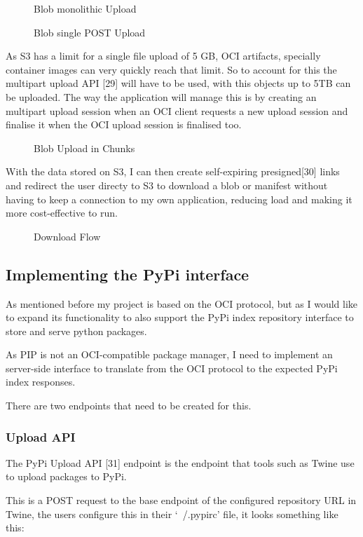 \documentclass{article}
\newcommand{\widefig}[3][1.2\textwidth]{%
  \begin{figure}[H]
    \makebox[\textwidth][c]{%
      \texttt{[image: \#2]}%
    }
    \caption{#3}
  \end{figure}
}
\begin{document}
  \widefig{appendix/blob-monolithic-upload-with-session.png}{Blob monolithic Upload}

  \widefig{appendix/blob-single-post-upload.png}{Blob single POST Upload}

  As S3 has a limit for a single file upload of 5 GB, OCI artifacts, specially container images can very quickly reach that limit. So to account for this the multipart upload API [29] will have to be used, with this objects up to 5TB can be uploaded. The way the application will manage this is by creating an multipart upload session when an OCI client requests a new upload session and finalise it when the OCI upload session is finalised too.

  \widefig{appendix/blob-upload-in-chunks.png}{Blob Upload in Chunks}

  With the data stored on S3, I can then create self-expiring presigned[30] links and redirect the user directy to S3 to download a blob or manifest without having to keep a connection to my own application, reducing load and making it more cost-effective to run.

  \widefig{appendix/download-blob.png}{Download Flow}

  \subsection{Implementing the PyPi interface}

  As mentioned before my project is based on the OCI protocol, but as I would like to expand its functionality to also support the PyPi index repository interface to store and serve python packages.

  As PIP is not an OCI-compatible package manager, I need to implement an server-side interface to translate from the OCI protocol to the expected PyPi index responses.

  There are two endpoints that need to be created for this.

  \subsubsection{Upload API}

  The PyPi Upload API [31] endpoint is the endpoint that tools such as Twine use to upload packages to PyPi.

  This is a POST request to the base endpoint of the configured repository URL in Twine, the users configure this in their `~/.pypirc' file, it looks something like this:
\end{document}
